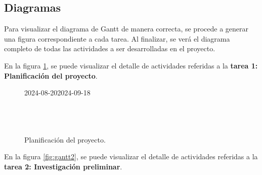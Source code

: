 \subsection{Diagramas}

Para visualizar el diagrama de Gantt de manera correcta, se procede a generar una figura correspondiente a cada tarea.
Al finalizar, se verá el diagrama completo de todas las actividades a ser desarrolladas en el proyecto.


En la figura \ref{fig:gantt1}, se puede visualizar el detalle de actividades referidas a la \textbf{tarea 1: Planificación del proyecto}.

\begin{figure}[H]
		\begin{ganttchart}[
				time slot unit=day,
				time slot format=isodate,
				x unit=0.35cm, %
				y unit title=0.7cm, %
				y unit chart=0.7cm, %
				milestone/.append style={xscale=4},
				vgrid,
				hgrid,
			]{2024-08-20}{2024-09-18}
			 \\
			 \\
			 \\
			 \\
		\end{ganttchart}
		\caption{Planificación del proyecto.}

	\label{fig:gantt1}
\end{figure}

En la figura \ref{fig:gantt2}, se puede visualizar el detalle de actividades referidas a la \textbf{tarea 2: Investigación preliminar}.

